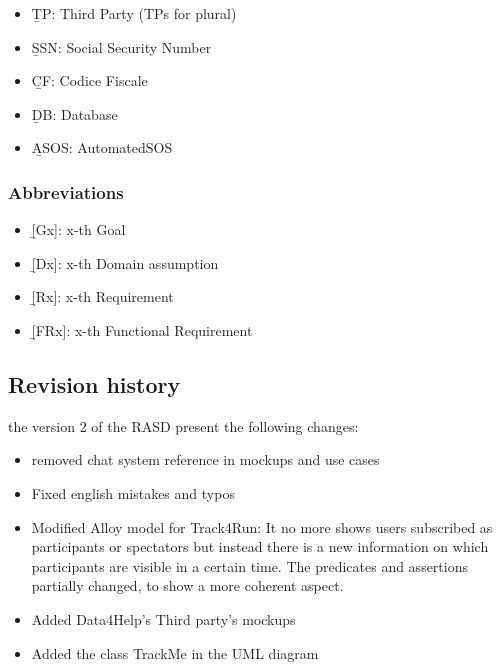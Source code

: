 \begin{itemize}
\item \b{TP:} Third Party (TPs for plural)
\item \b{SSN:} Social Security Number
\item \b{CF:} Codice Fiscale
\item \b{DB:} Database
\item \b{ASOS:} AutomatedSOS
\end{itemize}
{\color{secblue}\subsubsection{Abbreviations}}
\begin{itemize}
\item \b{[Gx]:} x-th Goal
\item \b{[Dx]:} x-th Domain assumption
\item \b{[Rx]:} x-th Requirement
\item \b{[FRx]:} x-th Functional Requirement
\end{itemize}
{\color{secblue}\subsection{Revision history}}
the version 2 of the RASD present the following changes:
\begin{itemize}
\item removed chat system reference in mockups and use cases
\item Fixed english mistakes and typos
\item Modified Alloy model for Track4Run: It no more shows users subscribed as participants or spectators but instead there is a new information on which participants are visible in a certain time. The predicates and assertions partially changed, to show a more coherent aspect.
\item Added Data4Help's Third party's mockups 
\item Added the class TrackMe in the UML diagram
\end{itemize}